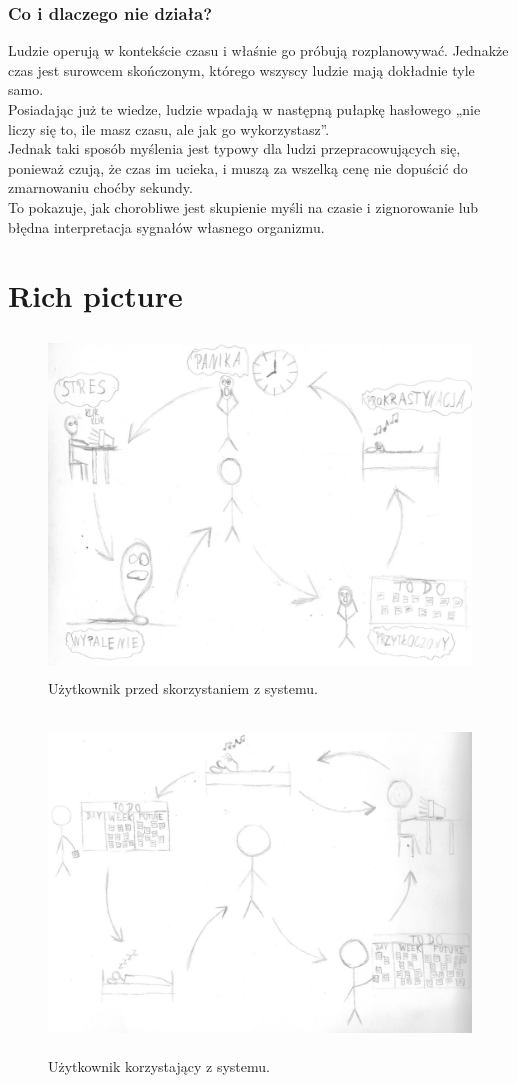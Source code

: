 \documentclass[a4paper,11pt]{report}
\begin{document}
\subsubsection{Co i dlaczego nie działa?}
Ludzie operują w kontekście czasu i właśnie go próbują rozplanowywać. Jednakże czas jest surowcem skończonym, którego wszyscy ludzie mają dokładnie tyle samo.
\\Posiadając już te wiedze, ludzie wpadają w następną pułapkę hasłowego „nie liczy się to, ile masz czasu, ale jak go wykorzystasz”.
\\Jednak taki sposób myślenia jest typowy dla ludzi przepracowujących się, ponieważ czują, że czas im ucieka, i muszą za wszelką cenę nie dopuścić do zmarnowaniu choćby sekundy.
\\To pokazuje, jak chorobliwe jest skupienie myśli na czasie i zignorowanie lub błędna interpretacja sygnałów własnego organizmu.
\section {Rich picture}
\begin{figure}[h]
	\centering
	\includegraphics[width=\textwidth, height=9cm]{richpicture1}
	\caption{Użytkownik przed skorzystaniem z systemu.}
	\label{fig:rich1}
\end{figure}
\begin{figure}[h]
	\centering
	\includegraphics[width=\textwidth, height=9cm]{richpicture2}
	\caption{Użytkownik korzystający z systemu.}
	\label{fig:rich2}
\end{figure}
\end{document}

